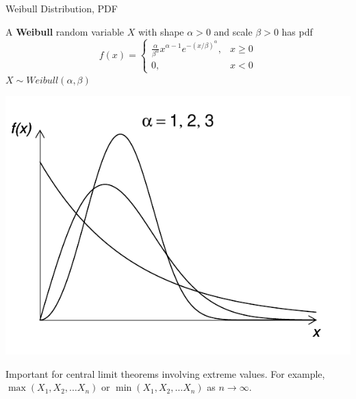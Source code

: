 \documentclass[handout]{beamer}
\begin{document}
\begin{frame}{Weibull Distribution, PDF}
    \begin{block}{}
        A \textbf{Weibull} random variable $X$ with shape $\alpha>0$ and scale $\beta>0$ has pdf
        $$f(x)=\begin{cases}\frac{\alpha}{\beta^\alpha}x^{\alpha-1}e^{-(x/\beta)^\alpha}, & x\geq 0 \\ 0, & x<0\end{cases}$$
        $X\sim Weibull(\alpha, \beta)$
    \end{block}
    \begin{center}
        \includegraphics[scale=.4]{ch4_pdf_weibull.pdf}
    \end{center}
    Important for central limit theorems involving extreme values. For example, $\max(X_1, X_2,\ldots X_n)$ or $\min(X_1, X_2,\ldots X_n)$ as $n\to \infty$.
\end{frame}
\end{document}

